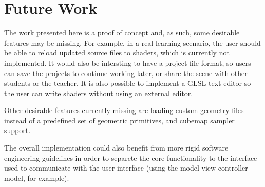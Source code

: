 \section{Future Work}
The work presented here is a proof of concept and, as such, some desirable features may be missing. For example, in a real learning scenario, the user should be able to reload updated source files to shaders, which is currently not implemented. It would also be intersting to have a project file format, so users can save the projects to continue working later, or share the scene with other students or the teacher. It is also possible to implement a GLSL text editor so the user can write shaders without using an external editor.

Other desirable features currently missing are loading custom geometry files instead of a predefined set of geometric primitives, and cubemap sampler support.

The overall implementation could also benefit from more rigid software engineering guidelines in order to separete the core functionality to the interface used to communicate with the user interface (using the model-view-controller model, for example).
